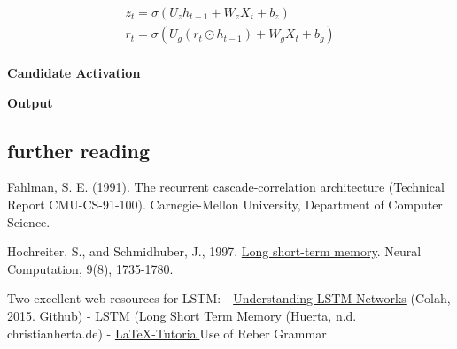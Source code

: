 \documentclass[11pt]{article}
\begin{document}
\begin{gather*}
    z_t = \sigma (U_{z}h_{t-1} + W_{z}X_t + b_z)\\
    r_t = \sigma (U_g(r_t \odot h_{t-1}) + W_g X_{t} + b_g)\\
\end{gather*}

\textbf{Candidate Activation}

\textbf{Output}

\subsection{further reading}\label{subsec:further-reading}

Fahlman, S. E. (1991). \href{https://citeseerx.ist.psu.edu/viewdoc/download?doi=10.1.1.52.7163&rep=rep1&type=pdf}{The recurrent cascade-correlation architecture} (Technical Report CMU-CS-91-100). Carnegie-Mellon University, Department of Computer Science.

Hochreiter, S., and Schmidhuber, J., 1997. \href{http://citeseerx.ist.psu.edu/viewdoc/download?doi=10.1.1.676.4320&rep=rep1&type=pdf}{Long short-term memory}. Neural Computation, 9(8), 1735-1780.

Two excellent web resources for LSTM:
- \href{http://colah.github.io/posts/2015-08-Understanding-LSTMs/}{Understanding LSTM Networks} (Colah, 2015. Github)
- \href{http://christianherta.de/lehre/dataScience/machineLearning/neuralNetworks/LSTM.php}{LSTM (Long Short Term Memory} (Huerta, n.d. christianherta.de)
- \href{https://www.deep-teaching.org/notebooks/sequence-learning/exercise-pytorch-char-rnn-reber-grammar}{LaTeX-Tutorial}Use of Reber Grammar
\end{document}
